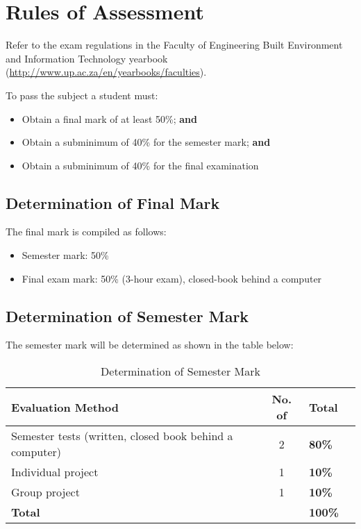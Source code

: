\section{Rules of Assessment}
    Refer to the exam regulations in the Faculty of Engineering Built
    Environment and Information Technology yearbook
    (\url{http://www.up.ac.za/en/yearbooks/faculties}).

    \noindent
    To pass the subject a student must:
    \begin{itemize}
        \item Obtain a final mark of at least 50\%; {\bf and}
        \item Obtain a subminimum of 40\% for the semester mark; {\bf and}
        \item Obtain a subminimum of 40\% for the final examination
    \end{itemize}

    \subsection{Determination of Final Mark}
        The final mark is compiled as follows:
        \begin{itemize}
            \item Semester mark: 50\%
            \item Final exam mark: 50\% (3-hour exam), closed-book behind a
                computer
        \end{itemize}

    \subsection{Determination of Semester Mark}
        The semester mark will be determined as shown in the table below:
        \begin{table}[!h]
            \begin{center}
             \begin{tabular}{|p{10cm}|c|l|l|}
               \hline
               {\bf Evaluation Method} & {\bf No. of} & {\bf Total} \\
               \hline
               Semester tests (written, closed book behind a computer)
               & 2 & {\bf 80\%} \\ \hline
               Individual project
               & 1 & {\bf 10\%} \\ \hline
               Group project
               & 1 & {\bf 10\%} \\ \hline
               \multicolumn{2}{|l|}{{\bf Total}} & {\bf 100\%} \\
               \hline
             \end{tabular}
             \caption{Determination of Semester Mark}
            \end{center}
        \end{table}


